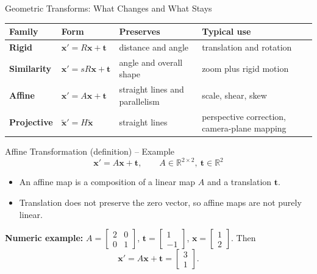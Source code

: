 \documentclass[aspectratio=169,10pt]{beamer}
\begin{document}
\begin{frame}{Geometric Transforms: What Changes and What Stays}
\small
\begin{tabularx}{\textwidth}{>{\bfseries}p{} >{\raggedright\arraybackslash}p{} >{\raggedright\arraybackslash}p{} X}
\toprule
Family & Form & Preserves & Typical use \\
\midrule
Rigid & $\mathbf{x}' = R\mathbf{x} + \mathbf{t}$ & distance and angle & translation and rotation \\
Similarity & $\mathbf{x}' = sR\mathbf{x} + \mathbf{t}$ & angle and overall shape & zoom plus rigid motion \\
Affine & $\mathbf{x}' = A\mathbf{x} + \mathbf{t}$ & straight lines and parallelism & scale, shear, skew \\
Projective & $\tilde{\mathbf{x}}' = H\tilde{\mathbf{x}}$ & straight lines & perspective correction, camera-plane mapping \\
\bottomrule
\end{tabularx}


\end{frame}

\begin{frame}{Affine Transformation (definition) -- Example}
\small
\[
\mathbf{x}' = A\mathbf{x} + \mathbf{t}, \qquad A\in\mathbb{R}^{2\times2},\ \mathbf{t}\in\mathbb{R}^2
\]
\vspace{0.4em}
\begin{itemize}
  \item An affine map is a composition of a linear map $A$ and a translation $\mathbf{t}$.
  \item Translation does not preserve the zero vector, so affine maps are not purely linear.
\end{itemize}
\vspace{0.6em}
\textbf{Numeric example: } $A=\begin{bmatrix}2&0\\0&1\end{bmatrix}$, $\mathbf{t}=\begin{bmatrix}1\\-1\end{bmatrix}$, $\mathbf{x}=\begin{bmatrix}1\\2\end{bmatrix}$. Then
\[
\mathbf{x}'=A\mathbf{x}+\mathbf{t}=\begin{bmatrix}3\\1\end{bmatrix}.
\]
\end{frame}
\end{document}
